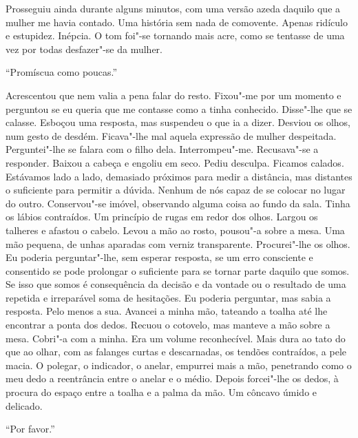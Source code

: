 Prosseguiu ainda durante alguns minutos, com uma versão azeda daquilo
que a mulher me havia contado. Uma história sem nada de comovente.
Apenas ridículo e estupidez. Inépcia. O tom foi"-se tornando mais acre,
como se tentasse de uma vez por todas desfazer"-se da mulher.

``Promíscua como poucas.''

Acrescentou que nem valia a pena falar do resto. Fixou"-me por um
momento e perguntou se eu queria que me contasse como a tinha conhecido.
Disse"-lhe que se calasse. Esboçou uma resposta, mas suspendeu o que ia
a dizer. Desviou os olhos, num gesto de desdém. Ficava"-lhe mal aquela
expressão de mulher despeitada. Perguntei"-lhe se falara com o filho
dela. Interrompeu"-me. Recusava"-se a responder. Baixou a cabeça e
engoliu em seco. Pediu desculpa. Ficamos calados. Estávamos lado a lado,
demasiado próximos para medir a distância, mas distantes o suficiente
para permitir a dúvida. Nenhum de nós capaz de se colocar no lugar do
outro. Conservou"-se imóvel, observando alguma coisa ao fundo da sala.
Tinha os lábios contraídos. Um princípio de rugas em redor dos olhos.
Largou os talheres e afastou o cabelo. Levou a mão ao rosto, pousou"-a
sobre a mesa. Uma mão pequena, de unhas aparadas com verniz
transparente. Procurei"-lhe os olhos. Eu poderia perguntar"-lhe, sem
esperar resposta, se um erro consciente e consentido se pode prolongar o
suficiente para se tornar parte daquilo que somos. Se isso que somos é
consequência da decisão e da vontade ou o resultado de uma repetida e
irreparável soma de hesitações. Eu poderia perguntar, mas sabia a
resposta. Pelo menos a sua. Avancei a minha mão, tateando a toalha até
lhe encontrar a ponta dos dedos. Recuou o cotovelo, mas manteve a mão
sobre a mesa. Cobri"-a com a minha. Era um volume reconhecível. Mais
dura ao tato do que ao olhar, com as falanges curtas e descarnadas, os
tendões contraídos, a pele macia. O polegar, o indicador, o anelar,
empurrei mais a mão, penetrando como o meu dedo a reentrância entre o
anelar e o médio. Depois forcei"-lhe os dedos, à procura do espaço entre
a toalha e a palma da mão. Um côncavo úmido e delicado.

``Por favor.''

